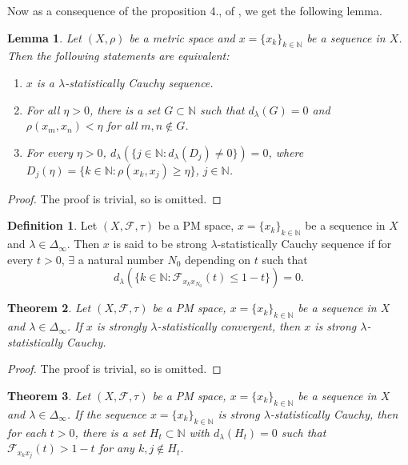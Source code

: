 \documentclass[reqno,b5paper]{amsart}
\theoremstyle{plain}
\newtheorem{thm}{Theorem}[section]
\newtheorem{lem}[thm]{Lemma}
\theoremstyle{definition}
\newtheorem{defn}{Definition}[section]
\begin{document}
Now as a consequence of the proposition 4., of \cite{De1}, we get
the following lemma.
\begin{lem}
Let $(X,\rho)$ be a metric space and $x=\{x_k\}_{k\in\mathbb{N}}$
be a sequence in $X$. Then the following statements are
equivalent:
\begin{enumerate}
    \item $x$ is a $\lambda$-statistically Cauchy sequence.
    \item  For all $\eta>0$, there is a set $G\subset\mathbb{N}$ such that $d_\lambda(G)=0$ and $\rho(x_m,x_n)<\eta$ for all $m,n\notin G$.
    \item For every $\eta>0$, $d_\lambda(\{j\in\mathbb{N}:d_\lambda(D_j)\neq 0\})=0$, where $D_j(\eta)=\{k\in\mathbb{N}:\rho(x_k,x_j)\geq \eta\}$, $j\in\mathbb{N}$.
\end{enumerate}
\end{lem}
\begin{proof}
The proof is trivial, so is omitted.
\end{proof}
\begin{defn}
Let $(X,\mathcal{F},\tau)$ be a PM space, $x=\{x_k\}_{k \in
\mathbb{N}}$ be a sequence in $X$ and $\lambda\in\Delta_\infty$.
Then $x$ is said to be strong $\lambda$-statistically Cauchy
sequence if for every $t>0$, $\exists$ a natural number $N_0$
depending on $t$ such that
$$d_\lambda(\{k\in \mathbb{N}: \mathcal{F}_{x_kx_{N_0}}(t)\leq 1-t\})=0.$$
\end{defn}
\begin{thm}
Let $(X,\mathcal{F},\tau)$ be a PM space, $x=\{x_k\}_{k \in
\mathbb{N}}$ be a sequence in $X$ and $\lambda\in\Delta_\infty$.
If $x$ is strongly $\lambda$-statistically convergent, then $x$ is
strong $\lambda$-statistically Cauchy.
\end{thm}
\begin{proof}
The proof is trivial, so is omitted.
\end{proof}
\begin{thm}
Let $(X,\mathcal{F},\tau)$ be a PM space, $x=\{x_k\}_{k \in
\mathbb{N}}$ be a sequence in $X$ and $\lambda\in\Delta_\infty$.
If the sequence $x=\{x_k\}_{k \in \mathbb{N}}$ is strong
$\lambda$-statistically Cauchy, then for each $t>0$, there is a
set $H_t\subset \mathbb{N}$ with $d_\lambda(H_t)=0$ such that
$\mathcal{F}_{x_kx_j}(t)>1-t$ for any $k,j\notin H_t$.
\end{thm}
\end{document}

